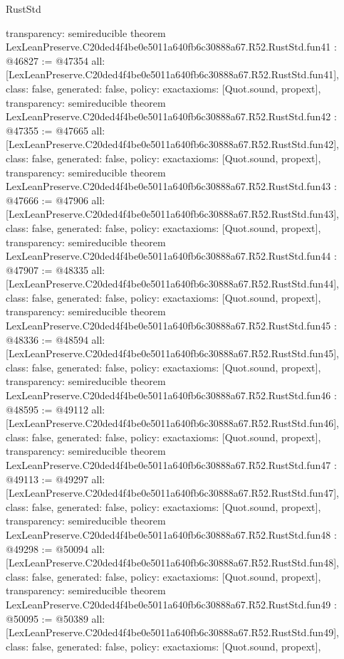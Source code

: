 \begin{lexlean}{RustStd}
\begin{coremodule}
{  transparency: semireducible
}
theorem LexLeanPreserve.C20ded4f4be0e5011a640fb6c30888a67.R52.RustStd.fun41 : @46827 := @47354 {
  all: [LexLeanPreserve.C20ded4f4be0e5011a640fb6c30888a67.R52.RustStd.fun41],
  class: false,
  generated: false,
  policy: exact{axioms: [Quot.sound, propext]},
  transparency: semireducible
}
theorem LexLeanPreserve.C20ded4f4be0e5011a640fb6c30888a67.R52.RustStd.fun42 : @47355 := @47665 {
  all: [LexLeanPreserve.C20ded4f4be0e5011a640fb6c30888a67.R52.RustStd.fun42],
  class: false,
  generated: false,
  policy: exact{axioms: [Quot.sound, propext]},
  transparency: semireducible
}
theorem LexLeanPreserve.C20ded4f4be0e5011a640fb6c30888a67.R52.RustStd.fun43 : @47666 := @47906 {
  all: [LexLeanPreserve.C20ded4f4be0e5011a640fb6c30888a67.R52.RustStd.fun43],
  class: false,
  generated: false,
  policy: exact{axioms: [Quot.sound, propext]},
  transparency: semireducible
}
theorem LexLeanPreserve.C20ded4f4be0e5011a640fb6c30888a67.R52.RustStd.fun44 : @47907 := @48335 {
  all: [LexLeanPreserve.C20ded4f4be0e5011a640fb6c30888a67.R52.RustStd.fun44],
  class: false,
  generated: false,
  policy: exact{axioms: [Quot.sound, propext]},
  transparency: semireducible
}
theorem LexLeanPreserve.C20ded4f4be0e5011a640fb6c30888a67.R52.RustStd.fun45 : @48336 := @48594 {
  all: [LexLeanPreserve.C20ded4f4be0e5011a640fb6c30888a67.R52.RustStd.fun45],
  class: false,
  generated: false,
  policy: exact{axioms: [Quot.sound, propext]},
  transparency: semireducible
}
theorem LexLeanPreserve.C20ded4f4be0e5011a640fb6c30888a67.R52.RustStd.fun46 : @48595 := @49112 {
  all: [LexLeanPreserve.C20ded4f4be0e5011a640fb6c30888a67.R52.RustStd.fun46],
  class: false,
  generated: false,
  policy: exact{axioms: [Quot.sound, propext]},
  transparency: semireducible
}
theorem LexLeanPreserve.C20ded4f4be0e5011a640fb6c30888a67.R52.RustStd.fun47 : @49113 := @49297 {
  all: [LexLeanPreserve.C20ded4f4be0e5011a640fb6c30888a67.R52.RustStd.fun47],
  class: false,
  generated: false,
  policy: exact{axioms: [Quot.sound, propext]},
  transparency: semireducible
}
theorem LexLeanPreserve.C20ded4f4be0e5011a640fb6c30888a67.R52.RustStd.fun48 : @49298 := @50094 {
  all: [LexLeanPreserve.C20ded4f4be0e5011a640fb6c30888a67.R52.RustStd.fun48],
  class: false,
  generated: false,
  policy: exact{axioms: [Quot.sound, propext]},
  transparency: semireducible
}
theorem LexLeanPreserve.C20ded4f4be0e5011a640fb6c30888a67.R52.RustStd.fun49 : @50095 := @50389 {
  all: [LexLeanPreserve.C20ded4f4be0e5011a640fb6c30888a67.R52.RustStd.fun49],
  class: false,
  generated: false,
  policy: exact{axioms: [Quot.sound, propext]},
}
\end{coremodule}
\end{lexlean}
